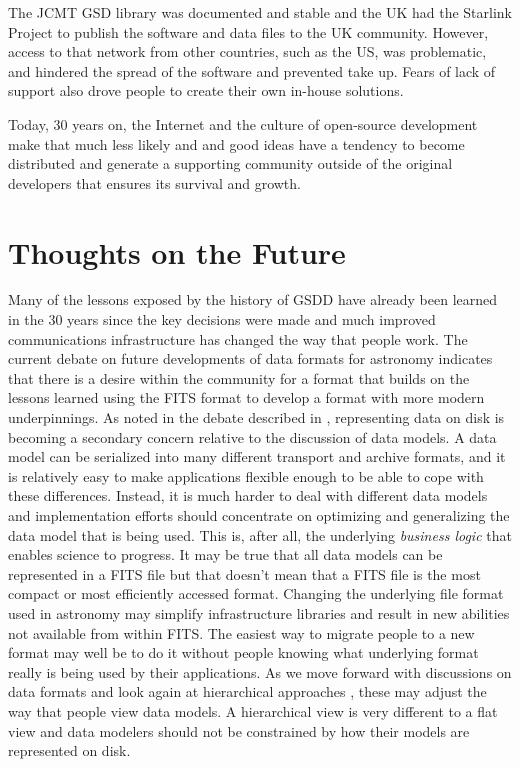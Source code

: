 \documentclass[final,authoryear,5p,times,twocolumn]{elsarticle}
\begin{document}
The JCMT GSD library was documented and stable and the UK had the
Starlink Project \citep{1982QJRAS..23..485D} to publish the software
and data files to the UK community. However, access to that network from other
countries, such as the US, was problematic, and hindered the spread of
the software and prevented take up. Fears of lack of support also
drove people to create their own in-house solutions.

Today, 30 years on, the Internet and the culture of open-source
development make that much less likely and
and good ideas have a tendency to become distributed and generate a
supporting community outside of the original developers that ensures
its survival and growth.

\section{Thoughts on the Future}

Many of the lessons exposed by the history of GSDD have already been
learned in the 30 years since the key decisions were made and much
improved communications infrastructure has changed the way that people
work.  The current debate on future developments of data formats for
astronomy \citep[see e.g.][]{2015Thomas,2015Mink,2015MinkADASS}
indicates that there is a desire within the community for a format
that builds on the lessons learned using the FITS format to develop a
format with more modern underpinnings.  As noted in the debate
described in \citet{2015MinkADASS}, representing data on disk is
becoming a secondary concern relative to the discussion of data
models. A data model can be serialized into many different transport
and archive formats, and
it is relatively easy to make applications flexible enough to be
able to cope with these differences. Instead, it is much harder to
deal with different data models and implementation efforts should
concentrate on optimizing and generalizing the data model that is
being used. This is, after all,
the underlying \emph{business logic} that enables science to progress.
It may be true that all data models can be represented in a FITS file
but that doesn't mean that a FITS file is the most compact or most
efficiently accessed format. Changing the underlying file format used
in astronomy may simplify infrastructure libraries and result in new
abilities not available from within FITS. The easiest way to
migrate people to a new format may well be to do it without people
knowing what underlying format really is being used by their
applications.  As we move forward with discussions on data formats and
look again at hierarchical approaches
\citep[e.g.][]{2015Price,2015HDS,2015ASDF}, these may adjust the way
that people view data models. A hierarchical view is very different to
a flat view and data modelers should not be constrained by how their
models are represented on disk.
\end{document}

